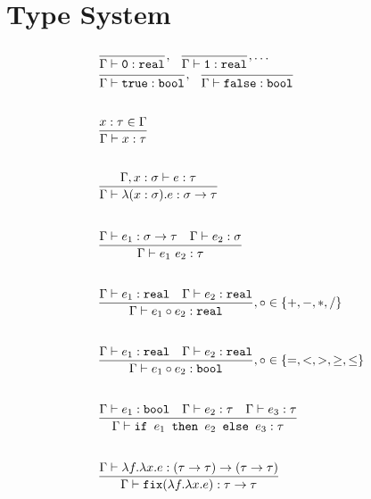 \section{Type System}
\begin{figure}[H]
\[
\begin{array}{lr}
\dfrac{}{\Gamma \vdash \texttt{0}: \texttt{real}}, \ \ \dfrac{}{\Gamma \vdash \texttt{1}: \texttt{real}}, \ldots \\
\dfrac{}{\Gamma \vdash \texttt{true} : \texttt{bool}}, \ \ \dfrac{}{\Gamma \vdash \texttt{false} : \texttt{bool}} \\ \\ \\
\dfrac{x : \tau \in \Gamma}{\Gamma \vdash x : \tau } \\ \\ \\
\dfrac{\Gamma, x : \sigma \vdash e : \tau}{\Gamma \vdash \lambda (x : \sigma).e : \sigma \rightarrow \tau } \\ \\ \\ 
\dfrac{\Gamma \vdash e_1: \sigma \rightarrow \tau \ \ \ \Gamma \vdash e_2 : \sigma}{\Gamma \vdash e_1 \ e_2 : \tau} \\ \\ \\
\dfrac{\Gamma \vdash e_1 : \texttt{real} \ \ \ \Gamma \vdash e_2 : \texttt{real}}{\Gamma \vdash e_1 \circ e_2 : \texttt{real}}
, \circ \in \{+,-,*,/\} \\ \\ \\
\dfrac{\Gamma \vdash e_1 : \texttt{real} \ \ \ \Gamma \vdash e_2 : \texttt{real}}{\Gamma \vdash e_1 \circ e_2 : \texttt{bool}}
, \circ \in \{=, <, >, \geq, \leq\} \\ \\ \\
\dfrac{\Gamma \vdash e_1 : \texttt{bool} \ \ \ \Gamma \vdash e_2 : \tau \ \ \ \Gamma \vdash e_3 : \tau}
{\Gamma \vdash \ifelse{e_1}{e_2}{e_3} : \tau} \\ \\ \\
\dfrac{\Gamma \vdash \lambda f. \lambda x.e : (\tau \rightarrow \tau) \rightarrow (\tau \rightarrow \tau)}
{\Gamma \vdash \texttt{fix}(\lambda f. \lambda x.e) : \tau \rightarrow \tau} \\ \\ \\ 
\end{array}
\]
\end{figure}

